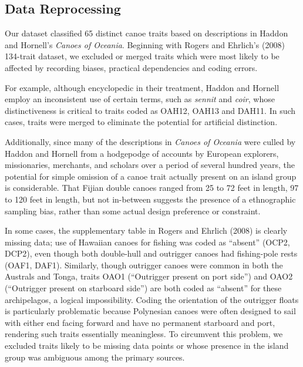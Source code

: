 \subsection{Data Reprocessing}



Our dataset classified 65 distinct canoe traits based on descriptions in Haddon and Hornell's \textit{Canoes of Oceania}.  Beginning with Rogers and Ehrlich's (2008) 134-trait dataset, we excluded or merged traits which were most likely to be affected by recording biases, practical dependencies and coding errors.

For example, although encyclopedic in their treatment, Haddon and Hornell employ an inconsistent use of certain terms, such as \textit{sennit} and \textit{coir}, whose distinctiveness is critical to traits coded as OAH12, OAH13 and DAH11.  In such cases, traits were merged to eliminate the potential for artificial distinction.  

Additionally, since many of the descriptions in \textit{Canoes of Oceania} were culled by Haddon and Hornell from a hodgepodge of accounts by European explorers, missionaries, merchants, and scholars over a period of several hundred years, the potential for simple omission of a canoe trait actually present on an island group is considerable.  That Fijian double canoes ranged from 25 to 72 feet in length, 97 to 120 feet in length, but not in-between suggests the presence of a ethnographic sampling bias, rather than some actual design preference or constraint.  

In some cases, the supplementary table in Rogers and Ehrlich (2008) is clearly missing data; use of Hawaiian canoes for fishing was coded as ``absent'' (OCP2, DCP2), even though both double-hull and outrigger canoes had fishing-pole rests (OAF1, DAF1).  Similarly, though outrigger canoes were common in both the Australs and Tonga, traits OAO1 (``Outrigger present on port side'') and OAO2 (``Outrigger present on starboard side'') are both coded as ``absent'' for these archipelagos, a logical impossibility.  Coding the orientation of the outrigger floats is particularly problematic because Polynesian canoes were often designed to sail with either end facing forward and have no permanent starboard and port, rendering such traits essentially meaningless.  To circumvent this problem, we excluded traits likely to be missing data points or whose presence in the island group was ambiguous among the primary sources.

